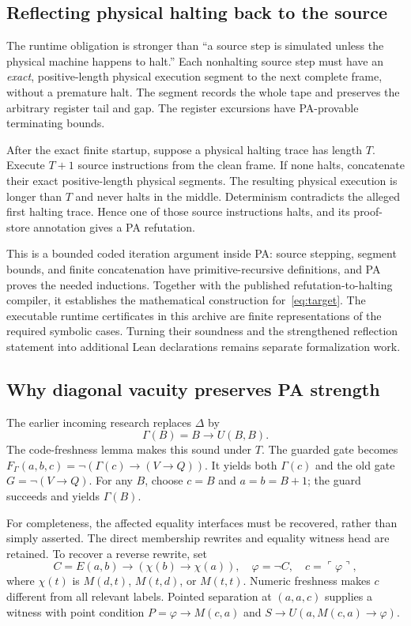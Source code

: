 \subsection{Reflecting physical halting back to the source}
The runtime obligation is stronger than ``a source step is simulated unless the physical machine happens to halt.'' Each nonhalting source step must have an \emph{exact}, positive-length physical execution segment to the next complete frame, without a premature halt. The segment records the whole tape and preserves the arbitrary register tail and gap. The register excursions have PA-provable terminating bounds.

After the exact finite startup, suppose a physical halting trace has length $T$. Execute $T+1$ source instructions from the clean frame. If none halts, concatenate their exact positive-length physical segments. The resulting physical execution is longer than $T$ and never halts in the middle. Determinism contradicts the alleged first halting trace. Hence one of those source instructions halts, and its proof-store annotation gives a PA refutation.

This is a bounded coded iteration argument inside PA: source stepping, segment bounds, and finite concatenation have primitive-recursive definitions, and PA proves the needed inductions. Together with the published refutation-to-halting compiler, it establishes the mathematical construction for~\eqref{eq:target}. The executable runtime certificates in this archive are finite representations of the required symbolic cases. Turning their soundness and the strengthened reflection statement into additional Lean declarations remains separate formalization work.

\subsection{Why diagonal vacuity preserves PA strength}
The earlier incoming research replaces $\Delta$ by
\[
 \Gamma(B)=B\to U(B,B).
\]
The code-freshness lemma makes this sound under $T$. The guarded gate becomes
$F_\Gamma(a,b,c)=\neg(\Gamma(c)\to(V\to Q))$. It yields both $\Gamma(c)$ and the old gate $G=\neg(V\to Q)$. For any $B$, choose $c=B$ and $a=b=B+1$; the guard succeeds and yields $\Gamma(B)$.

For completeness, the affected equality interfaces must be recovered, rather than simply asserted. The direct membership rewrites and equality witness head are retained. To recover a reverse rewrite, set
\[
 C=E(a,b)\to(\chi(b)\to\chi(a)),\quad
 \varphi=\neg C,\quad c=\ulcorner\varphi\urcorner,
\]
where $\chi(t)$ is $M(d,t)$, $M(t,d)$, or $M(t,t)$. Numeric freshness makes $c$ different from all relevant labels. Pointed separation at $(a,a,c)$ supplies a witness with point condition $P=\varphi\to M(c,a)$ and
$S\to U(a,M(c,a)\to\varphi)$.

